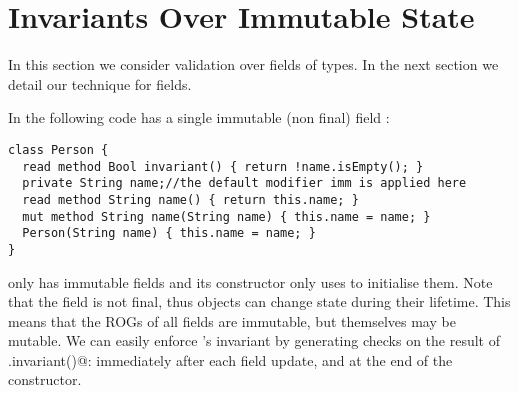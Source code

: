 \section{Invariants Over Immutable State}
\label{s:immutable}
In this section we consider validation over fields of \Q@imm@ types.
In the next section we detail our technique for \Q@capsule@ fields.

In the following code \Q@Person@ has a single immutable (non final) field \Q@name@:
\begin{lstlisting}
class Person {
  read method Bool invariant() { return !name.isEmpty(); }
  private String name;//the default modifier imm is applied here
  read method String name() { return this.name; }
  mut method String name(String name) { this.name = name; }
  Person(String name) { this.name = name; }
}
\end{lstlisting}
\Q@Person@ only has immutable fields and its constructor only uses \Q@this@ to initialise them.
Note that the \Q@name@ field is not final, thus \Q@Person@ objects can change state during their lifetime. This means that the ROGs of all \Q@Person@s fields are immutable, but \Q@Person@s themselves may be mutable.
We can easily enforce \Q@Person@'s invariant by generating checks on the result of \Q@this.invariant()@: immediately after each field update, and at the end of the constructor.%

